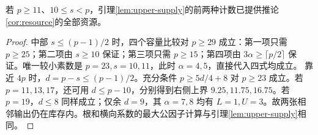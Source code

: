 \begin{lemma}\label{lem:upper-small}
若 $p\ge11$、$10\le s<p$，引理\ref{lem:upper-supply}的前两种计数已提供推论\ref{cor:resource}的全部资源。
\end{lemma}
\begin{proof}
中部 $s\le(p-1)/2$ 时，四个容量比较对 $p\ge29$ 成立：第一项只需 $p\ge25$；第二项由 $s\ge10$ 保证；第三项只需 $p\ge15$；第四项由 $3\alpha\ge\lceil p/2\rceil$ 保证。唯一较小素数是 $p=23,s=10,11$，此时 $\alpha=4,5$，直接代入四式均成立。
靠近 $4p$ 时，$d=p-s\le(p-1)/2$。充分条件 $p\ge5d/4+8$ 对 $p\ge23$ 成立。若 $p=11,13,17$，还可用 $d\le p-10$，分别得到右侧上界 $9.25,11.75,16.75$。若 $p=19$，$d\le8$ 同样成立；仅余 $d=9$，其 $\alpha=7,8$ 均有 $L=1,U=3$。故两张相邻输出仍在库存内。根和横向系数的最大公因子计算与引理\ref{lem:upper-supply}相同。
\end{proof}


